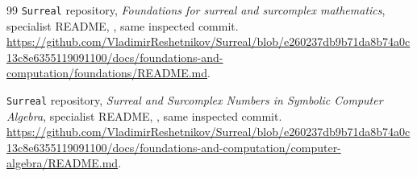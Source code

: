 \documentclass[11pt,a4paper]{article}
\theoremstyle{definition}
\numberwithin{equation}{section}
\begin{document}
\begin{thebibliography}{99}
\texttt{Surreal} repository,
\emph{Foundations for surreal and surcomplex mathematics},
specialist README,
,
same inspected commit.
\url{https://github.com/VladimirReshetnikov/Surreal/blob/e260237db9b71da8b74a0c13c8e6355119091100/docs/foundations-and-computation/foundations/README.md}.

\texttt{Surreal} repository,
\emph{Surreal and Surcomplex Numbers in Symbolic Computer Algebra},
specialist README,
,
same inspected commit.
\url{https://github.com/VladimirReshetnikov/Surreal/blob/e260237db9b71da8b74a0c13c8e6355119091100/docs/foundations-and-computation/computer-algebra/README.md}.

\end{thebibliography}
\end{document}
